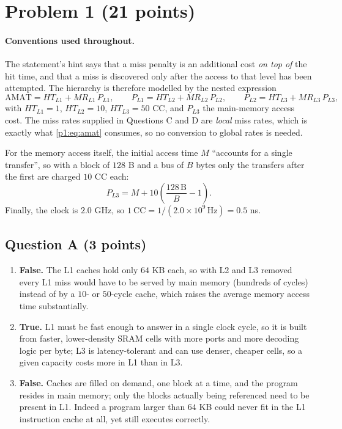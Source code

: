 \section{Problem 1 (21 points)}

\paragraph{Conventions used throughout.}
The statement's hint says that a miss penalty is an additional cost \emph{on top of} the
hit time, and that a miss is discovered only after the access to that level has been
attempted. The hierarchy is therefore modelled by the nested expression
\begin{equation}
\label{p1:eq:amat}
\mathrm{AMAT}=HT_{L1}+MR_{L1}\,P_{L1},\qquad
P_{L1}=HT_{L2}+MR_{L2}\,P_{L2},\qquad
P_{L2}=HT_{L3}+MR_{L3}\,P_{L3},
\end{equation}
with $HT_{L1}=1$, $HT_{L2}=10$, $HT_{L3}=50$ CC, and $P_{L3}$ the main-memory access
cost. The miss rates supplied in Questions C and D are \emph{local} miss rates, which is
exactly what \eqref{p1:eq:amat} consumes, so no conversion to global rates is needed.

For the memory access itself, the initial access time $M$ ``accounts for a single
transfer'', so with a block of $128$ B and a bus of $B$ bytes only the transfers after
the first are charged $10$ CC each:
\begin{equation}
\label{p1:eq:pl3}
P_{L3}=M+10\left(\frac{128\,\mathrm{B}}{B}-1\right).
\end{equation}
Finally, the clock is $2.0$ GHz, so $1\ \mathrm{CC}=1/(2.0\times10^{9}\,\mathrm{Hz})=0.5$ ns.

\subsection*{Question A (3 points)}

\begin{enumerate}
  \item[(1)] \textbf{False.} The L1 caches hold only $64$ KB each, so with L2 and L3
  removed every L1 miss would have to be served by main memory (hundreds of cycles)
  instead of by a $10$- or $50$-cycle cache, which raises the average memory access time
  substantially.

  \item[(2)] \textbf{True.} L1 must be fast enough to answer in a single clock cycle, so
  it is built from faster, lower-density SRAM cells with more ports and more decoding
  logic per byte; L3 is latency-tolerant and can use denser, cheaper cells, so a given
  capacity costs more in L1 than in L3.

  \item[(3)] \textbf{False.} Caches are filled on demand, one block at a time, and the
  program resides in main memory; only the blocks actually being referenced need to be
  present in L1. Indeed a program larger than $64$ KB could never fit in the L1
  instruction cache at all, yet still executes correctly.
\end{enumerate}

